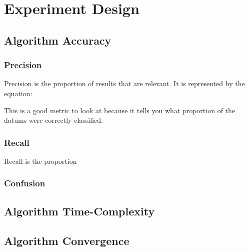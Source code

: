\documentclass{article}
\begin{document}
	\section{Experiment Design}
		\subsection{Algorithm Accuracy}
			\subsubsection{Precision}
			Precision is the proportion of results that are relevant\cite{ai}. It is represented by the equation:
			
			This is a good metric to look at because it tells you what proportion of the datums were correctly classified. 
			\subsubsection{Recall}
			Recall is the proportion 
			\subsubsection{Confusion}
		\subsection{Algorithm Time-Complexity}
		\subsection{Algorithm Convergence}
			\label{convergence}



		
	
\end{document}

